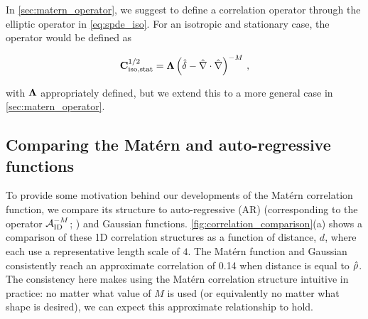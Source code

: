 
In \cref{sec:matern_operator}, we suggest to define a correlation operator through the
elliptic operator in \cref{eq:spde_iso}.
For an isotropic and stationary case, the operator would be defined as
\begin{linenomath*}\begin{equation}
    \mathbf{C}^{1/2}_\text{iso,stat} = \bm{\Lambda} \left(\hat{\delta} -
    \hat{\nabla}\cdot\hat{\nabla}\right)^{-M} \, ,
    \label{eq:matern_corr_isostat}
\end{equation}\end{linenomath*}
with $\bm{\Lambda}$ appropriately defined, but we extend this to a more general
case in \cref{sec:matern_operator}.


\subsection{Comparing the Mat\'ern and auto-regressive functions}
\label{ssec:correlation_comparison}

To provide some motivation behind our developments of the Mat\'ern
correlation function, we compare its structure to auto-regressive (AR)
(corresponding to the operator $\mathcal{A}_\text{ID}^{-M}$; \citep{mirouze_representation_2010})
and Gaussian functions.
\cref{fig:correlation_comparison}(a) shows a comparison of these 1D correlation
structures as a function of distance, $d$, where each use a representative length
scale of $4$.
The Mat\'ern function and Gaussian consistently reach an approximate correlation
of 0.14 when distance is equal to $\hat{\rho}$.
The consistency here makes using the Mat\'ern correlation structure intuitive in
practice: no matter what value of $M$ is used (or equivalently no matter what
shape is desired), we can expect this approximate relationship to hold.

